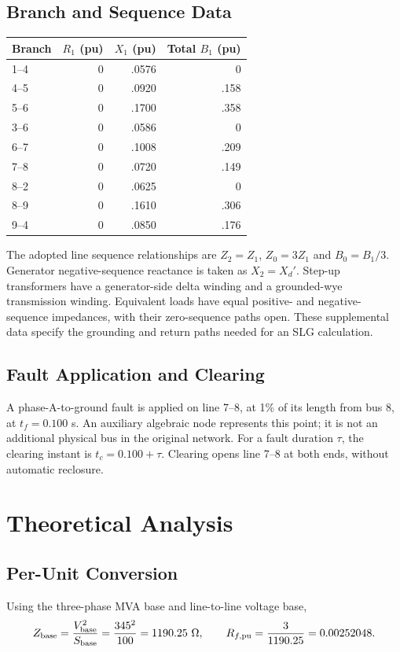 \documentclass[11pt,a4paper]{article}
\begin{document}
\subsection{Branch and Sequence Data}
\begin{center}\begin{tabular}{lrrr}\toprule Branch&$R_1$ (pu)&$X_1$ (pu)&Total $B_1$ (pu)\\\midrule
1--4&0&.0576&0\\4--5&0&.0920&.158\\5--6&0&.1700&.358\\3--6&0&.0586&0\\6--7&0&.1008&.209\\7--8&0&.0720&.149\\8--2&0&.0625&0\\8--9&0&.1610&.306\\9--4&0&.0850&.176\\\bottomrule\end{tabular}\end{center}
The adopted line sequence relationships are $Z_2=Z_1$, $Z_0=3Z_1$ and $B_0=B_1/3$. Generator negative-sequence reactance is taken as $X_2=X_d'$. Step-up transformers have a generator-side delta winding and a grounded-wye transmission winding. Equivalent loads have equal positive- and negative-sequence impedances, with their zero-sequence paths open. These supplemental data specify the grounding and return paths needed for an SLG calculation.
\subsection{Fault Application and Clearing}
A phase-A-to-ground fault is applied on line 7--8, at 1\% of its length from bus 8, at $t_f=0.100$ s. An auxiliary algebraic node represents this point; it is not an additional physical bus in the original network. For a fault duration $\tau$, the clearing instant is $t_c=0.100+\tau$. Clearing opens line 7--8 at both ends, without automatic reclosure.
\section{Theoretical Analysis}
\subsection{Per-Unit Conversion}
Using the three-phase MVA base and line-to-line voltage base,
\[Z_{\rm base}=\frac{V_{\rm base}^2}{S_{\rm base}}=\frac{345^2}{100}=1190.25\ \Omega,
\qquad R_{f,\rm pu}=\frac{3}{1190.25}=0.00252048.\]
\end{document}
